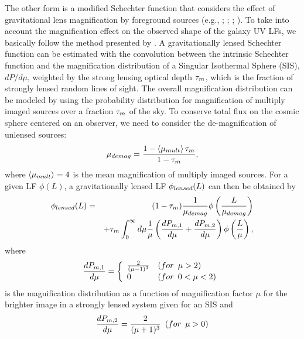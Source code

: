 \documentclass[]{pasj01}
\begin{document}
The other form is 
a modified Schechter function that considers 
the effect of gravitational lens magnification by foreground sources 
(e.g., \cite{2011Natur.469..181W}; \cite{2011ApJ...742...15T}; \cite{2015ApJ...805...79M}; \cite{2015MNRAS.450.1224B}). 
To take into account the magnification effect on the observed shape of the galaxy UV LFs, 
we basically follow the method presented by \citet{2011Natur.469..181W}. 
A gravitationally lensed Schechter function can be estimated with 
the convolution between the intrinsic Schechter function  
and the magnification distribution of a Singular Isothermal Sphere (SIS), $dP/d\mu$, 
weighted by the strong lensing optical depth $\tau_{\rm m}$, 
which is the fraction of strongly lensed random lines of sight.  
The overall magnification distribution 
can be modeled by using the probability distribution for magnification 
of multiply imaged sources over a fraction $\tau_{\rm m}$ of the sky. 
To conserve total flux on the cosmic sphere centered on an observer, 
we need to consider the de-magnification of unlensed sources:  
\begin{equation}
\mu_{\rm demag}
	= \frac{1 - \left\langle \mu_{\rm mult} \right\rangle \tau_{\rm m}}{1 - \tau_{\rm m}}, 
\end{equation} 
where $\left\langle \mu_{\rm mult} \right\rangle = 4$  
is the mean magnification of multiply imaged sources. 
For a given LF $\phi(L)$, 
a gravitationally lensed LF $\phi_{\rm lensed}(L)$ can then be obtained by 
\begin{eqnarray}
\phi_{\rm lensed} (L)
	&=& (1 - \tau_{\rm m}) \frac{1}{\mu_{\rm demag}} \phi \left( \frac{L}{\mu_{\rm demag}} \right) \nonumber \\
	&\hspace{1em}& + \tau_{\rm m} \int^\infty_0 d \mu \frac{1}{\mu} 
			\left( \frac{dP_{\rm m,1}}{d\mu} + \frac{dP_{\rm m,2}}{d\mu} \right) \phi\left( \frac{L}{\mu} \right), 
\end{eqnarray}
where 
\begin{equation}
\frac{dP_{\rm m,1}}{d\mu}
= 
\left\{ 
	\begin{array}{ll}
		\frac{2}{(\mu - 1)^3} & ({\rm for} \,\,\, \mu > 2) \\
		0 & ({\rm for} \,\,\, 0< \mu < 2)
	\end{array}
\right. 
\end{equation}
is the magnification distribution 
as a function of magnification factor $\mu$ 
for the brighter image 
in a strongly lensed system given for an SIS 
and 
\begin{equation}
\frac{dP_{\rm m,2}}{d\mu}
	= \frac{2}{(\mu + 1)^3} \,\,\, ({\rm for} \,\,\, \mu > 0) 
\end{equation}
\end{document}
